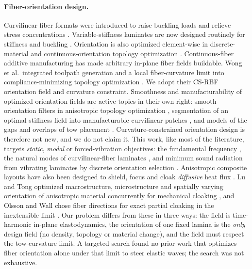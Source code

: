 \paragraph{Fiber-orientation design.} Curvilinear fiber formats were introduced to raise
buckling loads and relieve stress concentrations \cite{hyer1991}. Variable-stiffness
laminates are now designed routinely for stiffness and buckling \cite{gurdal}. Orientation
is also optimized element-wise in discrete-material and continuous-orientation topology
optimization \cite{stegmann2005,nomura2015}. Continuous-fiber additive manufacturing
\cite{matsuzaki2016} has made arbitrary in-plane fiber fields buildable. Wong et al.\
integrated toolpath generation and a local fiber-curvature limit into
compliance-minimizing topology optimization \cite{wong2025}. We adopt their CS-RBF
orientation field and curvature constraint. Smoothness and manufacturability of optimized orientation fields are active topics in their own
right: smooth-orientation filters in anisotropic topology optimization \cite{jiang2024}, segmentation
of an optimal stiffness field into manufacturable curvilinear patches \cite{sheikhi2024}, and models
of the gaps and overlaps of tow placement \cite{fayazbakhsh2013,pagani2025}. Curvature-constrained
orientation design is therefore not new, and we do not claim it. This work, like most of the
literature, targets \emph{static}, \emph{modal} or forced-vibration objectives: the fundamental
frequency \cite{abdalla2007,pagani2025}, the natural modes of curvilinear-fiber laminates
\cite{akhavan2011}, and minimum sound radiation from vibrating laminates by discrete orientation
selection \cite{niu2010}. Anisotropic composite layouts have also
been designed to shield, focus and cloak \emph{diffusive} heat flux
\cite{dede2013smo,dede2013apl}. Lu and Tong optimized macrostructure, microstructure and spatially varying orientation of
anisotropic material concurrently for mechanical cloaking \cite{lutong2025}, and Olsson and Wall chose
fiber directions for exact partial cloaking in the inextensible limit \cite{olsson2011}. Our problem
differs from these in three ways: the field is time-harmonic in-plane elastodynamics, the
orientation of one fixed lamina is the \emph{only} design field (no density, topology or material
change), and the field must respect the tow-curvature limit. A targeted search found no prior work
that optimizes fiber orientation alone under that limit to steer elastic waves; the search was not
exhaustive.

